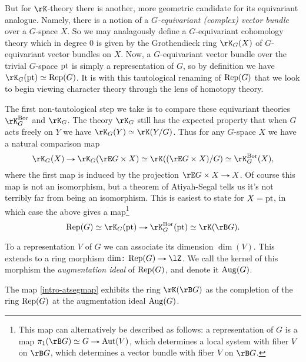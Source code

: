 But for $\rK$-theory there is another, more geometric candidate for
its equivariant analogue. Namely, there is a notion of a
\emph{$G$-equivariant (complex) vector bundle} over a $G$-space
$X$. So we may analagously define a $G$-equivariant cohomology theory
which in degree $0$ is given by the Grothendieck ring $\rK_G(X)$ of
$G$-equivariant vector bundles on $X$. Now, a $G$-equivariant vector
bundle over the trivial $G$-space $\mathrm{pt}$ is simply a representation of
$G$, so by definition we have $\rK_G(\pt) \iso \Rep(G)$. It is with
this tautological renaming of $\operatorname{Rep}(G)$ that we look to begin viewing
character theory through the lens of homotopy theory.

The first non-tautological step we take is to compare these
equivariant theories $\rK^\Bor_G$ and $\rK_G$. The theory $\rK_G$
still has the expected property that when $G$ acts freely on $Y$ we
have $\rK_G(Y) \iso \rK(Y/G)$. Thus for any $G$-space $X$ we have a
natural comparison map
\[
\rK_G(X) \to
\rK_G(\rE G \times X) \iso
\rK((\rE G \times X)/G) \iso
\rK^\Bor_G(X),
\]
where the first map is induced by the projection
$\rE G \times X \to X$. Of course this map is not an isomorphism, but
a theorem of Atiyah-Segal tells us it's not terribly far from being an
isomorphism. This is easiest to state for $X = \mathrm{pt}$, in which case the
above gives a map\footnote{This map can alternatively be described as
  follows: a representation of $G$ is a map
  $\pi_1(\rB G) \iso G \to \Aut(V)$, which determines a local system
  with fiber $V$ on $\rB G$, which determines a vector bundle with
  fiber $V$ on $\rB G$.}
\begin{equation}
  \label{intro-atsegmap}
  \Rep(G) \iso \rK_G(\pt) \to \rK^\Bor_G(\pt) \iso \rK(\rB G).
\end{equation}

\begin{definition}
  \label{intro-aug}
  To a representation $V$ of $G$ we can associate its dimension
  $\dim(V)$. This extends to a ring morphism
  $\dim \c \Rep(G) \to \lZ$. We call the kernel of this morphism the
  \emph{augmentation ideal} of $\operatorname{Rep}(G)$, and denote it $\operatorname{Aug}(G)$.
\end{definition}

\begin{theorem}
  \label{intro-atseg}
  The map \cref{intro-atsegmap} exhibits the ring $\rK(\rB G)$ as the
  completion of the ring $\operatorname{Rep}(G)$ at the augmentation ideal
  $\operatorname{Aug}(G)$.
\end{theorem}

